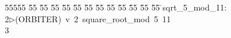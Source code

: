 %
%
\begin{tabbing}
55555 \= 55 \= 55 \= 55 \= 55 \= 55 \= 55 \= 55 \= 55 \= 55 \= 55 \= 55 \= 55 \= \>sqrt\_5\_mod\_11:\\[0pt]
2\>$\triangleright$\>(ORBITER)\ v\ 2\ square\_root\_mod\ 5\ 11\ \\[0pt]
3\>\end{tabbing}
